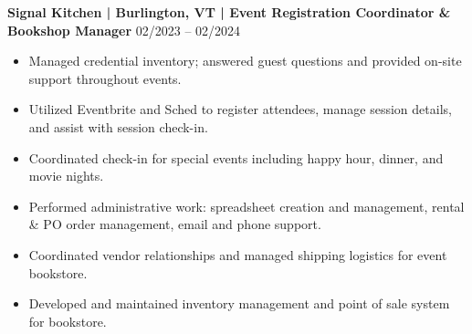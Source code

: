 \noindent
\textbf{Signal Kitchen | Burlington, VT | Event Registration Coordinator \& Bookshop Manager} \hfill 02/2023 -- 02/2024
\begin{itemize}
    \item Managed credential inventory; answered guest questions and provided on-site support throughout events.
    \item Utilized Eventbrite and Sched to register attendees, manage session details, and assist with session check-in.
    \item Coordinated check-in for special events including happy hour, dinner, and movie nights.
    \item Performed administrative work: spreadsheet creation and management, rental \& PO order management, email and phone support.
    \item Coordinated vendor relationships and managed shipping logistics for event bookstore.
    \item Developed and maintained inventory management and point of sale system for bookstore.
\end{itemize}
